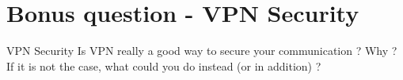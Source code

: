 \section{Bonus question - VPN Security}

\begin{bonusQuestionBox}{VPN Security}
    Is VPN really a good way to secure your communication ? Why ? If it is not the case, what could you do instead (or in addition) ?
\end{bonusQuestionBox}
